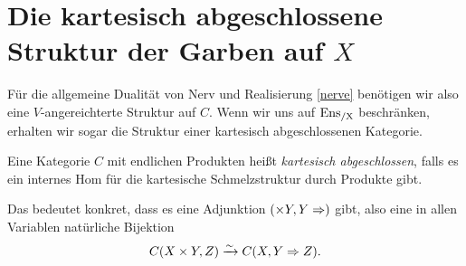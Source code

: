 \section[Die kartesisch abgeschlossene Struktur der Garben auf
  \texorpdfstring{$X$}{X}]
  {Die kartesisch abgeschlossene Struktur der Garben auf
  \texorpdfstring{$X$}{X}
  }
\label{sec:ensx-cart-closed}

Für die allgemeine Dualität von Nerv und Realisierung \ref{nerve}
benötigen wir also eine $V$-angereichterte Struktur auf $C$. Wenn wir
uns auf $\operatorname{Ens_{/X}}$ beschränken, erhalten wir sogar die Struktur einer
kartesisch abgeschlossenen Kategorie.
\begin{defn}
  Eine Kategorie $C$ mit endlichen Produkten heißt \emph{kartesisch
    abgeschlossen}, falls es ein internes Hom für die kartesische
  Schmelzstruktur durch Produkte gibt.
\end{defn}
Das bedeutet konkret, dass es eine Adjunktion $(\times Y, Y \Rightarrow)$
gibt, also eine in allen Variablen natürliche Bijektion
\[ C(X \times Y, Z) \xrightarrow[]{\sim} C(X, Y \Rightarrow Z). \]

